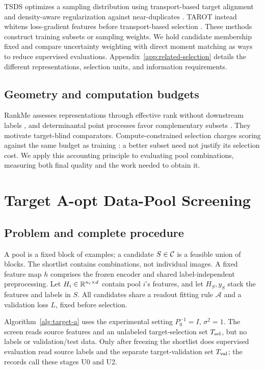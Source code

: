 TSDS optimizes a sampling distribution using transport-based target alignment and density-aware regularization against near-duplicates \citep{liu2024tsds}. TAROT instead whitens loss-gradient features before transport-based selection \citep{feng2025tarot}. These methods construct training subsets or sampling weights. We hold candidate membership fixed and compare uncertainty weighting with direct moment matching as ways to reduce supervised evaluations. Appendix~\ref{app:related-selection} details the different representations, selection units, and information requirements.

\subsection{Geometry and computation budgets}
RankMe assesses representations through effective rank without downstream labels \citep{garrido2023rankme}, and determinantal point processes favor complementary subsets \citep{kulesza2012}. They motivate target-blind comparators. Compute-constrained selection charges scoring against the same budget as training \citep{yin2025}: a better subset need not justify its selection cost. We apply this accounting principle to evaluating pool combinations, measuring both final quality and the work needed to obtain it.

\newpage
\section{Target A-opt Data-Pool Screening}
\label{sec:problem}
\label{sec:theory}
\subsection{Problem and complete procedure}
A pool is a fixed block of examples; a candidate $S\in\mathcal{C}$ is a feasible union of blocks. The shortlist contains combinations, not individual images. A fixed feature map $h$ comprises the frozen encoder and shared label-independent preprocessing. Let $H_i\in\mathbb{R}^{n_i\times d}$ contain pool $i$'s features, and let $H_S,y_S$ stack the features and labels in $S$. All candidates share a readout fitting rule $\mathcal A$ and a validation loss $L$, fixed before selection.

Algorithm~\ref{alg:target-a} uses the experimental setting $P_0^{-1}=I$, $\sigma^2=1$. The screen reads source features and an unlabeled target-selection set $T_{\rm sel}$, but no labels or validation/test data. Only after freezing the shortlist does supervised evaluation read source labels and the separate target-validation set $T_{\rm val}$; the records call these stages U0 and U2.

